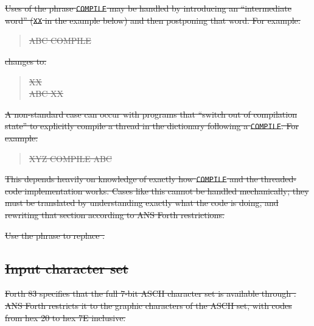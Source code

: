 \begin{description}
\sout{%
	Uses of the phrase \texttt{COMPILE} \word{[COMPILE]}
	 may be handled by introducing an
	``intermediate word'' (\texttt{XX} in the example below) and then
	postponing that word. For example:}
	\begin{quote}\ttfamily
		\sout{\word{:} ABC COMPILE \word{[COMPILE]}  \word{;}}
	\end{quote}
\sout{changes to:}
	\begin{quote}\ttfamily
		\sout{\word{:} XX   \word{;}} \\
		\sout{\word{:} ABC  XX \word{;}}
	\end{quote}
\sout{%
	A non-standard case can occur with programs that ``switch out of
	compilation state'' to explicitly compile a thread in the
	dictionary following a \texttt{COMPILE}. For example:}
	\begin{quote}\ttfamily
		\sout{\word{:} XYZ COMPILE \word{[}  ABC \word{,} \word{]} \word{;}}
	\end{quote}
\sout{%
	This depends heavily on knowledge of exactly how \texttt{COMPILE}
	and the threaded-code implementation works. Cases like this cannot
	be handled mechanically; they must be translated by understanding
	exactly what the code is doing, and rewriting that section according
	to ANS Forth restrictions.}

\sout{%
	Use the phrase  \word{[COMPILE]} to replace
	\word{[COMPILE]} \word{[COMPILE]}.}
\end{description}


\subsection[Input character set]{\sout{Input character set}} %

\sout{%
Forth 83 specifies that the full 7-bit ASCII character set is
available through . ANS Forth restricts it to the graphic
characters of the ASCII set, with codes from hex 20 to hex 7E
inclusive.}

